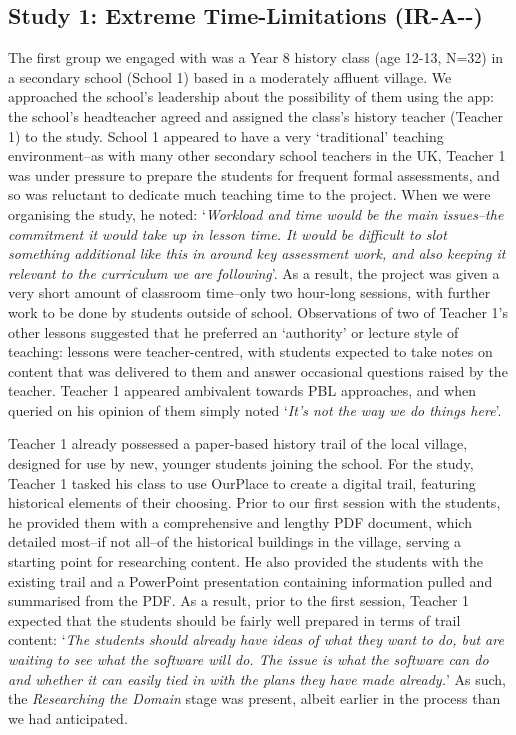 \documentclass[,hyphens]{sigchi}
\begin{document}
\subsection{Study 1: Extreme Time-Limitations (IR-A-\--)}
The first group we engaged with was a Year 8 history class (age 12-13, N=32) in a secondary school (School 1) based in a moderately affluent village. We approached the school's leadership about the possibility of them using the app: the school's headteacher agreed and assigned the class's history teacher (Teacher 1) to the study. School 1 appeared to have a very `traditional' teaching environment--as with many other secondary school teachers in the UK, Teacher 1 was under pressure to prepare the students for frequent formal assessments, and so was reluctant to dedicate much teaching time to the project. When we were organising the study, he noted: `\textit{Workload and time would be the main issues--the commitment it would take up in lesson time. It would be difficult to slot something additional like this in around key assessment work, and also keeping it relevant to the curriculum we are following}'. As a result, the project was given a very short amount of classroom time--only two hour-long sessions, with further work to be done by students outside of school. Observations of two of Teacher 1's other lessons suggested that he preferred an `authority' or lecture style of teaching: lessons were teacher-centred, with students expected to take notes on content that was delivered to them and answer occasional questions raised by the teacher. Teacher 1 appeared ambivalent towards PBL approaches, and when queried on his opinion of them simply noted `\textit{It's not the way we do things here}'.

Teacher 1 already possessed a paper-based history trail of the local village, designed for use by new, younger students joining the school. For the study, Teacher 1 tasked his class to use OurPlace to create a digital trail, featuring historical elements of their choosing. Prior to our first session with the students, he provided them with a comprehensive and lengthy PDF document, which detailed most--if not all--of the historical buildings in the village, serving a starting point for researching content. He also provided the students with the existing trail and a PowerPoint presentation containing information pulled and summarised from the PDF. As a result, prior to the first session, Teacher 1 expected that the students should be fairly well prepared in terms of trail content: `\textit{The students should already have ideas of what they want to do, but are waiting to see what the software will do. The issue is what the software can do and whether it can easily tied in with the plans they have made already.}'  As such, the \textit{Researching the Domain} stage was present, albeit earlier in the process than we had anticipated. 
\end{document}
